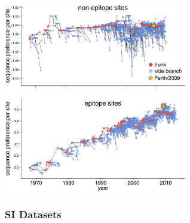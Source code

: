 \documentclass[9pt,twocolumn,twoside]{pnas-new}
\begin{document}
\begin{suppfigure}
\centerline{\includegraphics[width=0.6\textwidth]{figs/S05_seqpref_zoomed/seqpref_zoomed.pdf}}
\caption{\label{suppfig:seqpref_zoomed}
{\bf The per-site sequence preference at epitope and non-epitope sites.}
The per-site sequence preferences shown in Figure~\ref{fig:sequence_preference}B, but on separate y-axes.
}
\end{suppfigure}

\clearpage

\subsubsection*{SI Datasets} 
\FloatBarrier

\begin{suppdata}
\caption{\label{suppdata:PerthHA}
Genbank file giving the full sequence of the bidirectional reverse-genetics plasmid pHW-Perth09-HA-G78D-T212I, which encodes the wildtype HA sequence used in this study.
}
\end{suppdata}

\begin{suppdata}
\caption{\label{suppdata:bcsubamp_primers}
Excel file providing the primers used to generate the barcoded subamplicons for Perth/2009 HA deep sequencing.
}
\end{suppdata}

\begin{suppdata}
\caption{\label{suppdata:prefsfiles}
Excel file giving the amino-acid preferences in sequential 1, 2, ... numbering of the Perth/2009 HA.
The unscaled preferences for replicates 1, 2, 3-1, and 3-2 are each in a separate tab of the file.
Additional tabs give the across-replicate averaged and re-scaled amino-acid preferences in sequential numbering and in H3 numbering as shown in Figure~\ref{fig:logoplot}.
There are also tabs that give the conversion from sequential to H3 numbering, and the epitope sites in H3 numbering as defined by Wolf et al and used in this study.
Each tab can simply be exported to CSV for computational analyses.
}
\end{suppdata}
\end{document}
